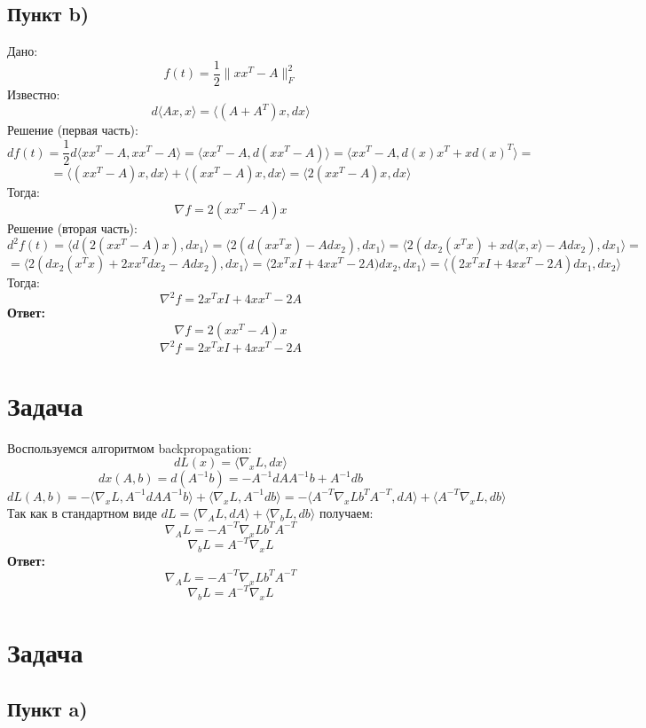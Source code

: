 \documentclass[a4paper,12pt]{article}
\begin{document}
\subsection{Пункт b)}

Дано:
    \[f(t) = \frac{1}{2} \|xx^T - A\|_F^2\]
Известно:
    \[d\langle Ax, x \rangle = \langle (A + A^T)x, dx \rangle \]
Решение (первая часть):
    \[df(t) = \frac{1}{2} d\langle xx^T - A, xx^T - A \rangle = \langle xx^T - A, d(xx^T - A) \rangle = \langle xx^T - A, d(x)x^T + xd(x)^T \rangle =\]
    \[= \langle (xx^T - A)x, dx \rangle + \langle (xx^T - A)x, dx \rangle = \langle 2(xx^T - A)x, dx \rangle\]
Тогда:
    \[\nabla f = 2(xx^T - A)x\]
Решение (вторая часть):
    \[d^2f(t) = \langle d(2(xx^T - A)x), dx_1 \rangle = \langle 2(d(xx^Tx) - Adx_2), dx_1 \rangle = \langle 2(dx_2(x^Tx) + x d\langle x, x \rangle - Adx_2), dx_1 \rangle =\]
    \[= \langle 2(dx_2(x^Tx) + 2xx^Tdx_2 - Adx_2), dx_1 \rangle = \langle 2x^TxI + 4xx^T - 2A)dx_2, dx_1 \rangle = \langle (2x^TxI + 4xx^T - 2A)dx_1, dx_2 \rangle\]
Тогда:
    \[\nabla^2f = 2x^TxI + 4xx^T - 2A\]
\textbf{Ответ:}
    \[\nabla f = 2(xx^T - A)x\]
    \[\nabla^2f = 2x^TxI + 4xx^T - 2A\]

\section{Задача}

Воспользуемся алгоритмом backpropagation:
    \[dL(x) = \langle \nabla_x L, dx \rangle\]
    \[dx(A,b) = d(A^{-1} b) = -A^{-1} dA A^{-1} b + A^{-1} db\]
    \[dL(A,b) = - \langle \nabla_x L, A^{-1} dA A^{-1} b \rangle + \langle \nabla_x L, A^{-1} db \rangle = - \langle A^{-T} \nabla_x L b^T A^{-T}, dA \rangle + \langle A^{-T} \nabla_x L, db \rangle\]
Так как в стандартном виде $dL = \langle \nabla_A L, dA \rangle + \langle \nabla_b L, db \rangle$ получаем:
    \[\nabla_A L = -A^{-T} \nabla_x L b^T A^ {-T}\]
    \[\nabla_b L = A^{-T} \nabla_x L\]
\textbf{Ответ:}
    \[\nabla_A L = -A^{-T} \nabla_x L b^T A^{-T}\]
    \[\nabla_b L = A^{-T} \nabla_x L\]

\section{Задача}

\subsection{Пункт a)}
\end{document}
